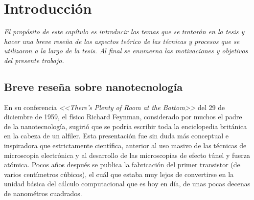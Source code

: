  \newcommand{\NoBiblioIntro}[1]{
 \ifthenelse{\equal{#1}{verdadero}}{}{}
 \NoBiblioIntro{verdadero}}


 \FormatoCapituloUnaLinea

 \chapter{Introducción}\label{chap:Introduccion}

 \thispagestyle{empty}
	
 \noindent\textit{El propósito de este capítulo es introducir los temas que se tratarán en la tesis y hacer una breve reseña de los  aspectos teórico de las técnicas y procesos que se utilizaron a la largo de la tesis. Al final se enumerna las motivaciones y objetivos del presente trabajo.}

 
 \vfill
 \minitoc
 \newpage

\section{Breve reseña sobre nanotecnología}

	 En su conferencia \textit{<<There's Plenty of Room at the Bottom>>} del 29 de diciembre de 1959, el físico Richard Feynman, considerado por muchos el padre de la nanotecnología, sugirió que se podría escribir toda la enciclopedia británica en la cabeza de un alfiler.\cite{Feynman1959} Esta presentación fue sin duda más conceptual e inspiradora que estrictamente científica, anterior al uso masivo de las técnicas de microscopia electrónica y al desarrollo de las microscopias de efecto túnel y fuerza atómica. Pocos años después se publica la fabricación del primer transistor (de varios centímetros cúbicos), el cuál que estaba muy lejos de convertirse en la unidad básica del cálculo computacional que es hoy en día, de unas pocas decenas de nanométros cuadrados. 

